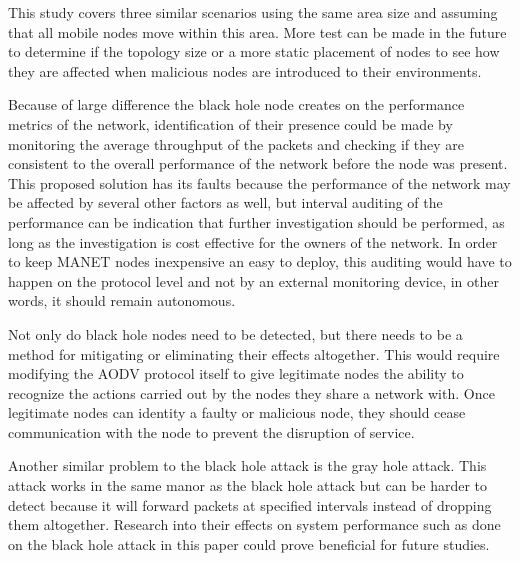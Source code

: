 \documentclass[conference,12pt]{IEEEtran}
\begin{document}
This study covers three similar scenarios using the same area size and assuming that all mobile nodes move within this area. More test can be made in the future to determine if the topology size or a more static placement of nodes to see how they are affected when malicious nodes are introduced to their environments. 

Because of large difference the black hole node creates on the performance metrics of the network, identification of their presence could be made by monitoring the average throughput of the packets and checking if they are consistent to the overall performance of the network before the node was present. This proposed solution has its faults because the performance of the network may be affected by several other factors as well, but interval auditing of the performance can be indication that further investigation should be performed, as long as the investigation is cost effective for the owners of the network. In order to keep MANET nodes inexpensive an easy to deploy, this auditing would have to happen on the protocol level and not by an external monitoring device, in other words, it should remain autonomous. 

Not only do black hole nodes need to be detected, but there needs to be a method for mitigating or eliminating their effects altogether. This would require modifying the AODV protocol itself to give legitimate nodes the ability to recognize the actions carried out by the nodes they share a network with. Once legitimate nodes can identity a faulty or malicious node, they should cease communication with the node to prevent the disruption of service.

Another similar problem to the black hole attack is the gray hole attack. This attack works in the same manor as the black hole attack but can be harder to detect because it will forward packets at specified intervals instead of dropping them altogether. Research into their effects on system performance such as done on the black hole attack in this paper could prove beneficial for future studies. 
\end{document}
